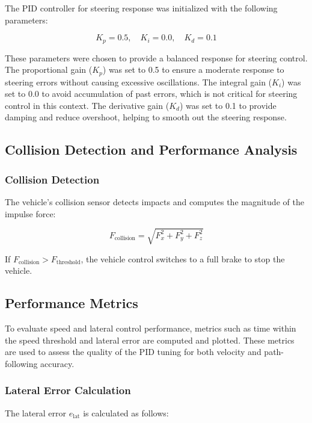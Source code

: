 \documentclass[conference]{IEEEtran}
\begin{document}
The PID controller for steering response was initialized with the following parameters:

\begin{equation}
K_p = 0.5,\quad K_i = 0.0,\quad K_d = 0.1
\end{equation}

These parameters were chosen to provide a balanced response for steering control. The proportional gain ($K_p$) was set to 0.5 to ensure a moderate response to steering errors without causing excessive oscillations. The integral gain ($K_i$) was set to 0.0 to avoid accumulation of past errors, which is not critical for steering control in this context. The derivative gain ($K_d$) was set to 0.1 to provide damping and reduce overshoot, helping to smooth out the steering response.

\subsection{Collision Detection and Performance Analysis}
\subsubsection{Collision Detection}
The vehicle's collision sensor detects impacts and computes the magnitude of the impulse force:

\begin{equation}
F_{\text{collision}} = \sqrt{F_x^2 + F_y^2 + F_z^2}
\end{equation}

If $F_{\text{collision}} > F_{\text{threshold}}$, the vehicle control switches to a full brake to stop the vehicle.

\subsection{Performance Metrics}
To evaluate speed and lateral control performance, metrics such as time within the speed threshold and lateral error are computed and plotted. These metrics are used to assess the quality of the PID tuning for both velocity and path-following accuracy.

\subsubsection{Lateral Error Calculation}

The lateral error $e_{\text{lat}}$ is calculated as follows:
\end{document}
